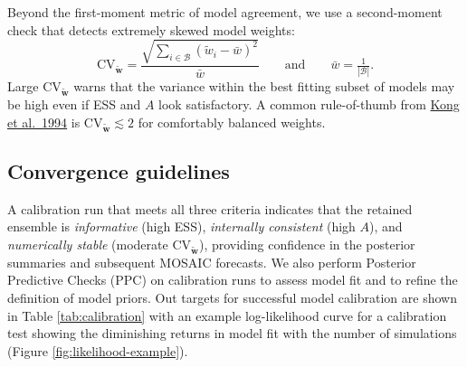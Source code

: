 \documentclass[
]{book}
\begin{document}
Beyond the first-moment metric of model agreement, we use a second-moment check that detects extremely skewed model weights:
\begin{equation}
\mathrm{CV}_\mathbf{\tilde{w}} =
\frac{\sqrt{\sum_{i\in\mathcal B}\left(\tilde{w}_i-\bar w\right)^2}}
{\bar w}
\qquad \text{and} \qquad
\bar w=\tfrac1{|\mathcal B|}.
\label{eq:cvw}
\end{equation}
Large \(\mathrm{CV}_\mathbf{\tilde{w}}\) warns that the variance within the best fitting subset of models may be high even if ESS and \(A\) look satisfactory. A common rule-of-thumb from \href{https://doi.org/10.1080/01621459.1994.10476469}{Kong et al.~1994} is \(\mathrm{CV}_\mathbf{\tilde{w}}\!\lesssim\!2\) for comfortably balanced weights.

\subsection{Convergence guidelines}\label{convergence-guidelines}

A calibration run that meets all three criteria indicates that the retained ensemble is \emph{informative} (high ESS), \emph{internally consistent} (high \(A\)), and \emph{numerically stable} (moderate \(\mathrm{CV}_\mathbf{\tilde{w}}\)), providing confidence in the posterior summaries and subsequent MOSAIC forecasts. We also perform Posterior Predictive Checks (PPC) on calibration runs to assess model fit and to refine the definition of model priors. Out targets for successful model calibration are shown in Table \ref{tab:calibration} with an example log-likelihood curve for a calibration test showing the diminishing returns in model fit with the number of simulations (Figure \ref{fig:likelihood-example}).
\end{document}
